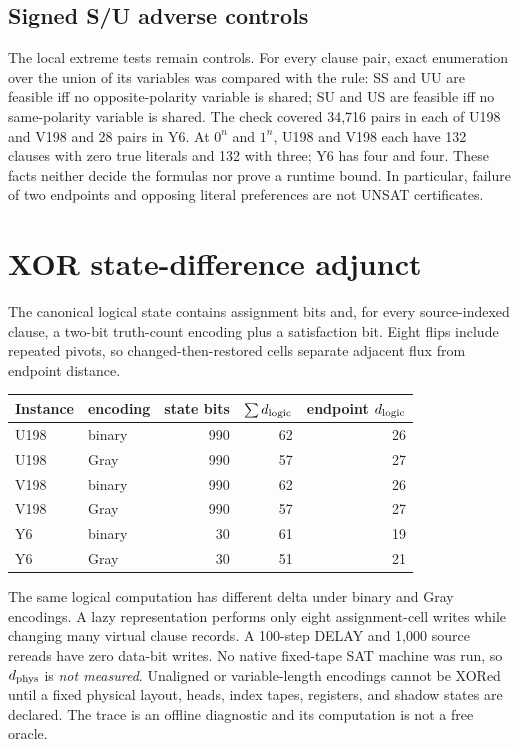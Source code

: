 \documentclass[11pt]{article}
\begin{document}
\subsection{Signed S/U adverse controls}
The local extreme tests remain controls.  For every clause pair, exact enumeration over the union of its variables was compared with the rule: SS and UU are feasible iff no opposite-polarity variable is shared; SU and US are feasible iff no same-polarity variable is shared.  The check covered 34,716 pairs in each of U198 and V198 and 28 pairs in Y6.  At $0^n$ and $1^n$, U198 and V198 each have 132 clauses with zero true literals and 132 with three; Y6 has four and four.  These facts neither decide the formulas nor prove a runtime bound.  In particular, failure of two endpoints and opposing literal preferences are not UNSAT certificates.

\section{XOR state-difference adjunct}

The canonical logical state contains assignment bits and, for every source-indexed clause, a two-bit truth-count encoding plus a satisfaction bit.  Eight flips include repeated pivots, so changed-then-restored cells separate adjacent flux from endpoint distance.
\begin{center}
\begin{tabular}{llrrr}
\toprule
Instance & encoding & state bits & $\sum d_{\rm logic}$ & endpoint $d_{\rm logic}$ \\
\midrule
U198 & binary & 990 & 62 & 26 \\
U198 & Gray & 990 & 57 & 27 \\
V198 & binary & 990 & 62 & 26 \\
V198 & Gray & 990 & 57 & 27 \\
Y6 & binary & 30 & 61 & 19 \\
Y6 & Gray & 30 & 51 & 21 \\
\bottomrule
\end{tabular}
\end{center}
The same logical computation has different delta under binary and Gray encodings.  A lazy representation performs only eight assignment-cell writes while changing many virtual clause records.  A 100-step DELAY and 1,000 source rereads have zero data-bit writes.  No native fixed-tape SAT machine was run, so $d_{\rm phys}$ is \emph{not measured}.  Unaligned or variable-length encodings cannot be XORed until a fixed physical layout, heads, index tapes, registers, and shadow states are declared.  The trace is an offline diagnostic and its computation is not a free oracle.
\end{document}
